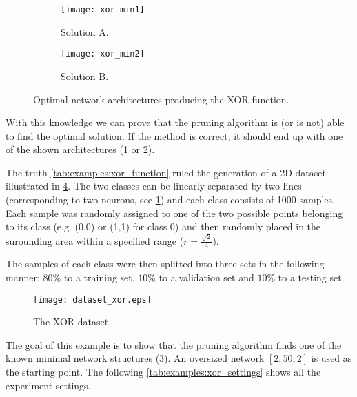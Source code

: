 \begin{figure}[H]
\centering
\begin{subfigure}{.4\textwidth}
  \centering
  \texttt{[image: xor\_min1]}
  \caption{Solution A.}
  \label{fig:examples:xor_min1}
\end{subfigure}
\begin{subfigure}{.4\textwidth}
  \centering
  \texttt{[image: xor\_min2]}
  \caption{Solution B.}
  \label{fig:examples:xor_min2}
\end{subfigure}
\caption{Optimal network architectures producing the XOR function.}
\label{fig:examples:xor_solutions}
\end{figure}

With this knowledge we can prove that the pruning algorithm is (or is not) able to find the optimal solution. If the method is correct, it should end up with one of the shown architectures (\cref{fig:examples:xor_min1} or \cref{fig:examples:xor_min2}).

The truth \cref{tab:examples:xor_function} ruled the generation of a 2D dataset illustrated in \cref{fig:examples:dataset_xor}. The two classes can be linearly separated by two lines (corresponding to two neurons, see \cref{fig:examples:xor_min1}) and each class consists of 1000 samples. Each sample was randomly assigned to one of the two possible points belonging to its class (e.g. (0,0) or (1,1) for class 0) and then randomly placed in the surounding area within a specified range ($ r = \frac{\sqrt{2}}{4} $).

The samples of each class were then splitted into three sets in the following manner: $ 80\% $ to a training set, $ 10\% $ to a validation set and $ 10\% $ to a testing set.

\begin{figure}[H]
\centering
\texttt{[image: dataset\_xor.eps]}
\caption{The XOR dataset.}
\label{fig:examples:dataset_xor}
\end{figure}

The goal of this example is to show that the pruning algorithm finds one of the known minimal network structures (\cref{fig:examples:xor_solutions}). An oversized network $ [2, 50, 2] $ is used as the starting point. The following \cref{tab:examples:xor_settings} shows all the experiment settings.

